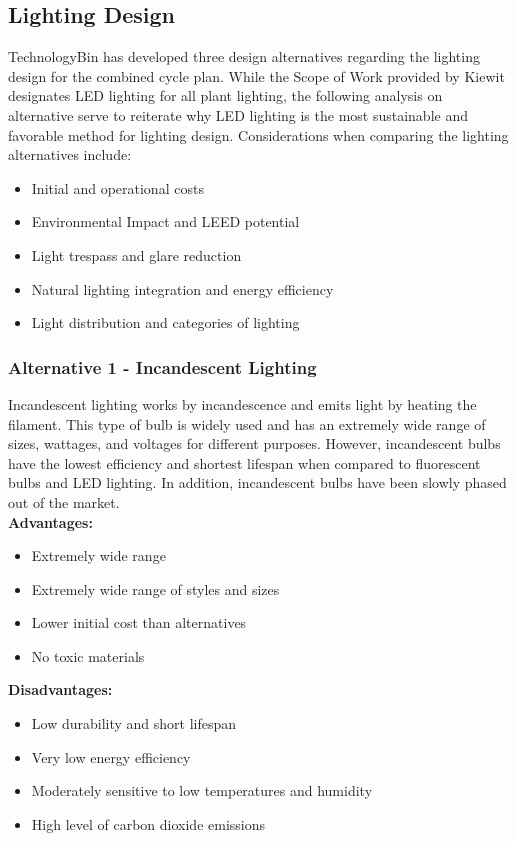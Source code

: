 \documentclass{ceri}
\begin{document}
\subsection{Lighting Design}

TechnologyBin has developed three design alternatives regarding the lighting design for the combined cycle plan. While the Scope of Work provided by Kiewit designates LED lighting for all plant lighting, the following analysis on alternative serve to reiterate why LED lighting is the most sustainable and favorable method for lighting design. Considerations when comparing the lighting alternatives include:\\
\begin{itemize}
    \item Initial and operational costs
    \item Environmental Impact and LEED potential
    \item Light trespass and glare reduction
    \item Natural lighting integration and energy efficiency
    \item Light distribution and categories of lighting
    \newline
\end{itemize}
\newpage
\subsubsection{Alternative 1 - Incandescent Lighting}

Incandescent lighting works by incandescence and emits light by heating the filament. This type of bulb is widely used and has an extremely wide range of sizes, wattages, and voltages for different purposes. However, incandescent bulbs have the lowest efficiency and shortest lifespan when compared to fluorescent bulbs and LED lighting. In addition, incandescent bulbs have been slowly phased out of the market.\\
\newline
\textbf{Advantages:}
\begin{itemize}
    \item Extremely wide range
    \item Extremely wide range of styles and sizes
    \item Lower initial cost than alternatives
    \item No toxic materials
\end{itemize}
\textbf{Disadvantages:}
\begin{itemize}
    \item Low durability and short lifespan
    \item Very low energy efficiency
    \item Moderately sensitive to low temperatures and humidity
    \item High level of carbon dioxide emissions
\end{itemize}
\end{document}
